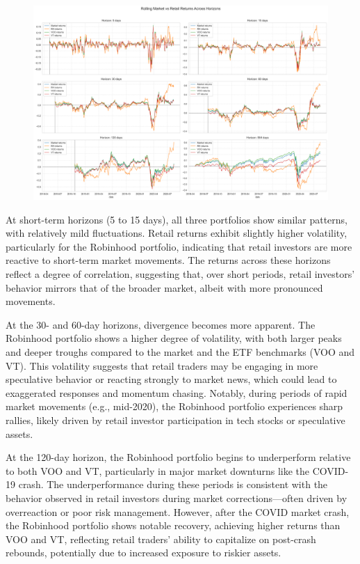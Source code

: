 \begin{figure}[h!]
    \centering
    \includegraphics[width=1\linewidth]
    {../images/returns_comparison.png}
    \label{fig:enter-label}
\end{figure}

At short-term horizons (5 to 15 days), all three portfolios show similar patterns, with relatively mild fluctuations. Retail returns exhibit slightly higher volatility, particularly for the Robinhood portfolio, indicating that retail investors are more reactive to short-term market movements. The returns across these horizons reflect a degree of correlation, suggesting that, over short periods, retail investors' behavior mirrors that of the broader market, albeit with more pronounced movements.

At the 30- and 60-day horizons, divergence becomes more apparent. The Robinhood portfolio shows a higher degree of volatility, with both larger peaks and deeper troughs compared to the market and the ETF benchmarks (VOO and VT). This volatility suggests that retail traders may be engaging in more speculative behavior or reacting strongly to market news, which could lead to exaggerated responses and momentum chasing. Notably, during periods of rapid market movements (e.g., mid-2020), the Robinhood portfolio experiences sharp rallies, likely driven by retail investor participation in tech stocks or speculative assets.

At the 120-day horizon, the Robinhood portfolio begins to underperform relative to both VOO and VT, particularly in major market downturns like the COVID-19 crash. The underperformance during these periods is consistent with the behavior observed in retail investors during market corrections—often driven by overreaction or poor risk management. However, after the COVID market crash, the Robinhood portfolio shows notable recovery, achieving higher returns than VOO and VT, reflecting retail traders' ability to capitalize on post-crash rebounds, potentially due to increased exposure to riskier assets.

